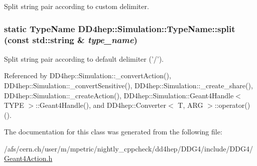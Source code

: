 Split string pair according to custom delimiter. \hypertarget{class_d_d4hep_1_1_simulation_1_1_type_name_a7deed2b938954f59c780e636ad5249da}{
\subsubsection[{split}]{\setlength{\rightskip}{0pt plus 5cm}static {\bf TypeName} DD4hep::Simulation::TypeName::split (const std::string \& {\em type\_\-name})}}
\label{class_d_d4hep_1_1_simulation_1_1_type_name_a7deed2b938954f59c780e636ad5249da}


Split string pair according to default delimiter ('/'). 

Referenced by DD4hep::Simulation::\_\-convertAction(), DD4hep::Simulation::\_\-convertSensitive(), DD4hep::Simulation::\_\-create\_\-share(), DD4hep::Simulation::\_\-createAction(), DD4hep::Simulation::Geant4Handle$<$ TYPE $>$::Geant4Handle(), and DD4hep::Converter$<$ T, ARG $>$::operator()().

The documentation for this class was generated from the following file:\begin{DoxyCompactItemize}
\item 
/afs/cern.ch/user/m/mpetric/nightly\_\-cppcheck/dd4hep/DDG4/include/DDG4/\hyperlink{_geant4_action_8h}{Geant4Action.h}\end{DoxyCompactItemize}
